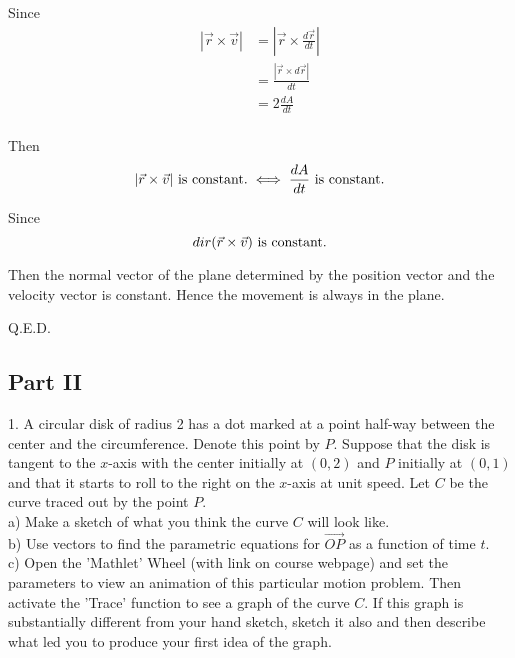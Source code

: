 \documentclass{article}
\begin{document}
Since
\begin{equation*}
  \begin{split}
    |\vec{r} \times \vec{v}| &= |\vec{r} \times \frac{d\vec{r}}{dt}| \\
                             &= \frac{|\vec{r} \times d\vec{r}|}{dt} \\
                             &= 2 \frac{dA}{dt} \\
  \end{split}
\end{equation*}

Then
\begin{equation*}
  |\vec{r} \times \vec{v}| \textnormal{ is constant.} \iff \frac{dA}{dt} \textnormal{ is constant.}
\end{equation*}

Since
\begin{equation*}
  dir(\vec{r} \times \vec{v}) \textnormal{ is constant.} 
\end{equation*}

Then the normal vector of the plane determined by the position vector and the 
velocity vector is constant. Hence the movement is always in the plane.

Q.E.D.

\begin{center}
\section*{Part II}
\end{center}

\bigskip

1. A circular disk of radius 2 has a dot marked at a point half-way between the 
center and the circumference. Denote this point by $P$. Suppose that the disk is 
tangent to the $x$-axis with the center initially at $(0, 2)$ and $P$ initially 
at $(0, 1)$ and that it starts to roll to the right on the $x$-axis at unit 
speed. Let $C$ be the curve traced out by the point $P$. \\
a) Make a sketch of what you think the curve $C$ will look like. \\
b) Use vectors to find the parametric equations for $\vec{OP}$ as a function of 
time $t$. \\
c) Open the 'Mathlet' Wheel (with link on course webpage) and set the parameters 
to view an animation of this particular motion problem. Then activate the 
'Trace' function to see a graph of the curve $C$. If this graph is substantially 
different from your hand sketch, sketch it also and then describe what led you 
to produce your first idea of the graph.
\end{document}
